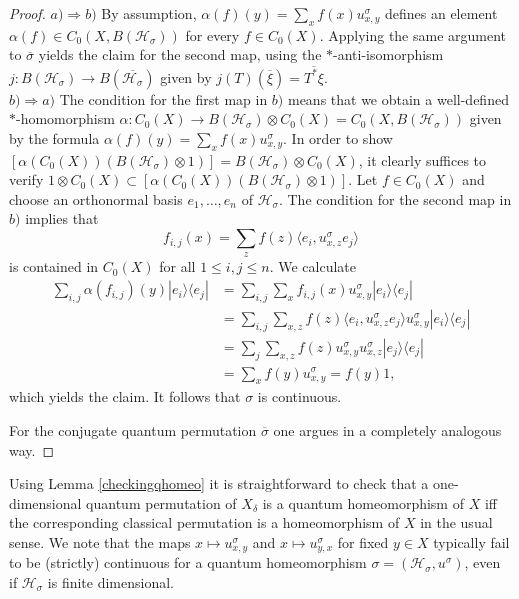 \documentclass[a4paper]{amsart}
\newcommand*{\Hc}{\mathcal{H}}
\newcommand*{\ket}{\rangle}
\newcommand*{\bra}{\langle}
\numberwithin{equation}{section}
\theoremstyle{change}
\begin{document}
\begin{proof} 
$ a) \Rightarrow b) $ By assumption, $ \alpha(f)(y) = \sum_x f(x) u^\sigma_{x,y} $ defines an element $ \alpha(f) \in C_0(X, B(\Hc_\sigma)) $ for every $ f \in C_0(X) $. Applying the same argument to $ \overline{\sigma} $ yields the claim for the second map, using the $ * $-anti-isomorphism $ j: B(\Hc_\sigma) \rightarrow B(\overline{\Hc_\sigma}) $ given by $ j(T) (\overline{\xi}) = \overline{T^* \xi} $. \\
$ b) \Rightarrow a) $ The condition for the first map in $ b) $ means that we obtain a well-defined $ * $-homomorphism $ \alpha: C_0(X) \rightarrow B(\Hc_\sigma) \otimes C_0(X) = C_0(X, B(\Hc_\sigma)) $ 
given by the formula $ \alpha(f)(y) = \sum_x f(x) u^\sigma_{x,y} $. In order to show $ [\alpha(C_0(X)) (B(\Hc_\sigma) \otimes 1)] = B(\Hc_\sigma) \otimes C_0(X) $, it clearly suffices to verify $ 1 \otimes C_0(X) \subset [\alpha(C_0(X)) (B(\Hc_\sigma) \otimes 1)] $. Let $ f \in C_0(X) $ and choose an orthonormal basis $ e_1, \dots, e_n $ of $ \Hc_\sigma $. The condition for the second map in $ b) $ implies that  
$$
f_{i,j}(x) = \sum_z f(z) \bra e_i, u^\sigma_{x,z} e_j \ket
$$
is contained in $ C_0(X) $ for all $ 1 \leq i,j \leq n $. We calculate 
\begin{align*}
\sum_{i,j} \alpha(f_{i,j})(y) |e_i \ket \bra e_j| &= \sum_{i,j} \sum_x f_{i,j}(x) u^\sigma_{x,y} |e_i \ket \bra e_j| \\
&= \sum_{i,j} \sum_{x,z} f(z) \bra e_i, u^\sigma_{x,z} e_j \ket u^\sigma_{x,y} |e_i \ket \bra e_j| \\
&= \sum_j \sum_{x,z} f(z) u^\sigma_{x,y} u^\sigma_{x,z} |e_j \ket \bra e_j| \\
&= \sum_{x} f(y) u^\sigma_{x,y} = f(y) 1,  
\end{align*}
which yields the claim. It follows that $ \sigma $ is continuous. 

For the conjugate quantum permutation $ \overline{\sigma} $ one argues in a completely analogous way. 
\end{proof} 

Using Lemma \ref{checkingqhomeo} it is straightforward to check that a one-dimensional quantum permutation of $ X_\delta $ is a quantum homeomorphism of $ X $ iff the corresponding classical permutation is a homeomorphism of $ X $ in the usual sense. 
We note that the maps $ x \mapsto u^\sigma_{x,y} $ and $ x \mapsto u^\sigma_{y,x} $ for fixed $ y \in X $ typically fail to be (strictly) continuous for a quantum homeomorphism $ \sigma = (\Hc_\sigma, u^\sigma) $, even if $ \Hc_\sigma $ is finite dimensional. 
\end{document}
